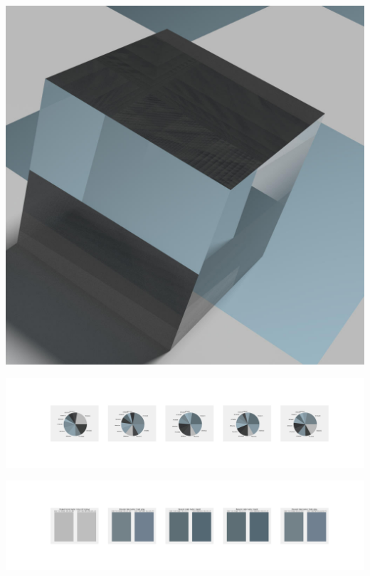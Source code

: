\documentclass[11pt]{article}
\begin{document}
\begin{landscape}
    \begin{center}
    \includegraphics[width=\textwidth]{./nbimg/file (176).jpg}
    \end{center}

    \begin{center}
    \includegraphics[width=250mm]{./nbimg/pie-85.jpg}
    \end{center}

    \begin{center}
    \includegraphics[width=250mm]{./nbimg/peak-85.jpg}
    \end{center}
    


\end{landscape}
\end{document}
